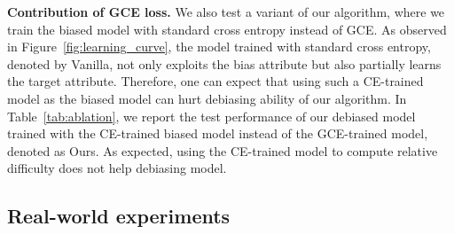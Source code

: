 \begin{table}[t!]
\centering
\caption{
Accuracy evaluated on the unbiased samples and bias-conflicting samples of the Colored MNIST and Corrupted CIFAR-10 dataset for ablation of the proposed algorithm. We denote our algorithm using vanilla model as biased model by Ours. Best performing results are marked in bold.
}
\label{tab:ablation}
\vspace{-.1in}
\end{table}
 
\textbf{Contribution of GCE loss.}
We also test a variant of our algorithm, where we train the biased model with standard cross entropy instead of GCE. As observed in Figure~\ref{fig:learning_curve}, the model trained with standard cross entropy, denoted by Vanilla, not only exploits the bias attribute but also partially learns the target attribute. Therefore, one can expect that using such a CE-trained model as the biased model can hurt debiasing ability of our algorithm. In Table~\ref{tab:ablation}, we report the test performance of our debiased model trained with the CE-trained biased model instead of the GCE-trained model, denoted as Ours. As expected, using the CE-trained model to compute relative difficulty does not help debiasing model. 




\subsection{Real-world experiments}

